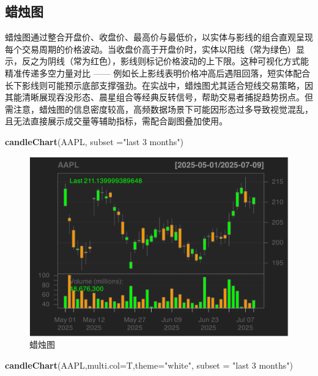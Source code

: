 \documentclass[]{ctexbook}
\newenvironment{Shaded}{\begin{snugshade}}{\end{snugshade}}
\newcommand{\AttributeTok}[1]{\textcolor[rgb]{0.13,0.29,0.53}{#1}}
\newcommand{\FunctionTok}[1]{\textcolor[rgb]{0.13,0.29,0.53}{\textbf{#1}}}
\newcommand{\NormalTok}[1]{#1}
\newcommand{\StringTok}[1]{\textcolor[rgb]{0.31,0.60,0.02}{#1}}
\begin{document}
\subsection{蜡烛图}\label{ux8721ux70dbux56fe}

蜡烛图通过整合开盘价、收盘价、最高价与最低价，以实体与影线的组合直观呈现每个交易周期的价格波动。当收盘价高于开盘价时，实体以阳线（常为绿色）显示，反之为阴线（常为红色），影线则标记价格波动的上下限。这种可视化方式能精准传递多空力量对比 ------ 例如长上影线表明价格冲高后遇阻回落，短实体配合长下影线则可能预示底部支撑强劲。在实战中，蜡烛图尤其适合短线交易策略，因其能清晰展现吞没形态、晨星组合等经典反转信号，帮助交易者捕捉趋势拐点。但需注意，蜡烛图的信息密度较高，高频数据场景下可能因形态过多导致视觉混乱，且无法直接展示成交量等辅助指标，需配合副图叠加使用。

\begin{Shaded}
\begin{Highlighting}[]
\FunctionTok{candleChart}\NormalTok{(AAPL, }\AttributeTok{subset =}\StringTok{"last 3 months"}\NormalTok{)}
\end{Highlighting}
\end{Shaded}

\begin{figure}
\includegraphics[width=0.9\linewidth]{quantmod_files/figure-latex/candle-1} \caption{蜡烛图}\label{fig:candle}
\end{figure}

\begin{Shaded}
\begin{Highlighting}[]
\FunctionTok{candleChart}\NormalTok{(AAPL,}\AttributeTok{multi.col=}\NormalTok{T,}\AttributeTok{theme=}\StringTok{"white"}\NormalTok{, }\AttributeTok{subset =} \StringTok{"last 3 months"}\NormalTok{)}
\end{Highlighting}
\end{Shaded}
\end{document}
